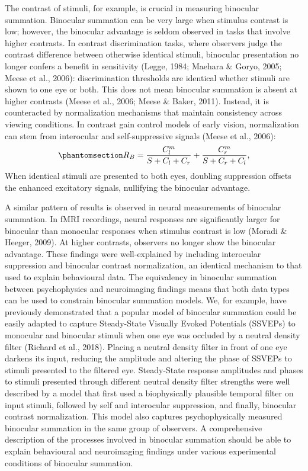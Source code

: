 \documentclass[
  12pt,
]{article}
\begin{document}
The contrast of stimuli, for example, is crucial in measuring binocular
summation. Binocular summation can be very large when stimulus contrast
is low; however, the binocular advantage is seldom observed in tasks
that involve higher contrasts. In contrast discrimination tasks, where
observers judge the contrast difference between otherwise identical
stimuli, binocular presentation no longer confers a benefit in
sensitivity (Legge, 1984; Maehara \& Goryo, 2005; Meese et al., 2006):
discrimination thresholds are identical whether stimuli are shown to one
eye or both. This does not mean binocular summation is absent at higher
contrasts (Meese et al., 2006; Meese \& Baker, 2011). Instead, it is
counteracted by normalization mechanisms that maintain consistency
across viewing conditions. In contrast gain control models of early
vision, normalization can stem from interocular and self-suppressive
signals (Meese et al., 2006):
\begin{equation}\phantomsection\label{eq-intoMath2}{
R_B = \frac{C_l^m}{S+C_l+C_r} + \frac{C_r^m}{S+C_r+C_l},
}\end{equation} When identical stimuli are presented to both eyes,
doubling suppression offsets the enhanced excitatory signals, nullifying
the binocular advantage.

A similar pattern of results is observed in neural measurements of
binocular summation. In fMRI recordings, neural responses are
significantly larger for binocular than monocular responses when
stimulus contrast is low (Moradi \& Heeger, 2009). At higher contrasts,
observers no longer show the binocular advantage. These findings were
well-explained by including interocular suppression and binocular
contrast normalization, an identical mechanism to that used to explain
behavioural data. The equivalency in binocular summation between
psychophysics and neuroimaging findings means that both data types can
be used to constrain binocular summation models. We, for example, have
previously demonstrated that a popular model of binocular summation
could be easily adapted to capture Steady-State Visually Evoked
Potentials (SSVEPs) to monocular and binocular stimuli when one eye was
occluded by a neutral density filter (Richard et al., 2018). Placing a
neutral density filter in front of one eye darkens its input, reducing
the amplitude and altering the phase of SSVEPs to stimuli presented to
the filtered eye. Steady-State response amplitudes and phases to stimuli
presented through different neutral density filter strengths were well
described by a model that first used a biophysically plausible temporal
filter on input stimuli, followed by self and interocular suppression,
and finally, binocular contrast normalization. This model also captures
psychophysically measured binocular summation in the same group of
observers. A comprehensive description of the processes involved in
binocular summation should be able to explain behavioural and
neuroimaging findings under various experimental conditions of binocular
summation.
\end{document}
